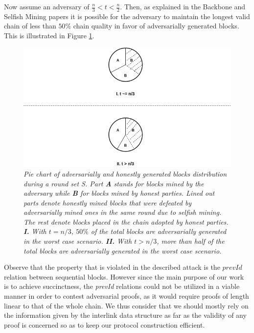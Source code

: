 Now assume an adversary of $ \frac{n}{3} < t < \frac{n}{2} $. Then, as explained in the Backbone and Selfish Mining papers \cite{Backbone}\cite{selfish_mining} it is possible for the adversary to maintain the longest valid chain of less than $50\%$ chain quality in favor of adversarially generated blocks. This is illustrated in Figure \ref{fig:selfish_mining_pie}. 

\begin{figure}[h!]
	\begin{center}
		\includegraphics[scale=0.55]{figures/selfish_mining_pie.png}
	\end{center}
	\caption{\textit{Pie chart of adversarially and honestly generated blocks distribution during a round set S. Part \textbf{A} stands for blocks mined by the adversary while \textbf{B} for blocks mined by honest parties. Lined out parts denote honestly mined blocks that were defeated by adversarially mined ones in the same round due to selfish mining. The rest denote blocks placed in the chain adopted by honest parties. \textbf{I.} With $t = n/3$, $50\%$ of the total blocks are adversarially generated in the worst case scenario. \textbf{II.} With $t > n/3$, more than half of the total blocks are adversarially generated in the worst case scenario.}}
	\label{fig:selfish_mining_pie}
\end{figure}

Observe that the property that is violated in the described attack is the $prevId$ relation between sequential blocks. However since the main purpose of our work is to achieve succinctness, the \textit{prevId} relations could not be utilized in a viable manner in order to contest adversarial proofs, as it would require proofs of length linear to that of the whole chain.  We thus consider that we should mostly rely on the information given by the interlink data structure as far as the validity of any proof is concerned so as to keep our protocol construction efficient.

